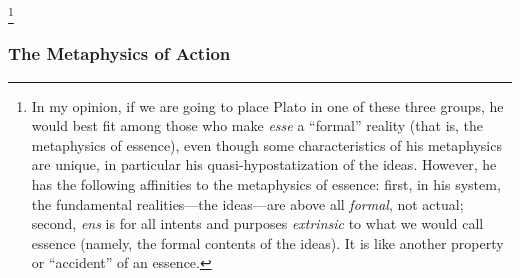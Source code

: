 %
\footnote{In my opinion, if we are going to place Plato in one of these three groups, he would best fit among those who make \emph{esse} a ``formal'' reality (that is, the metaphysics of essence), even though some characteristics of his metaphysics are unique, in particular his quasi-hypostatization of the ideas. However, he has the following affinities to the metaphysics of essence: first, in his system, the fundamental realities---the ideas---are above all \emph{formal}, not actual; second, \emph{ens} is for all intents and purposes \emph{extrinsic} to what we would call essence (namely, the formal contents of the ideas). It is like another property or ``accident'' of an essence.}

\subsubsection{The Metaphysics of Action}

